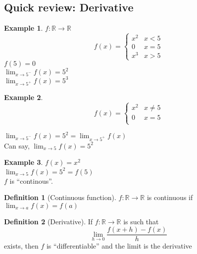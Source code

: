 \documentclass[twocolumn,20pt,fleqn]{extarticle}
\theoremstyle{plain}
\theoremstyle{definition}
\newtheorem*{definition}{Definition}
\newtheorem*{example}{Example}
\theoremstyle{remark}
\begin{document}
\subsection{Quick review: Derivative}
\begin{example}
  $f : \mathbb{R}\to \mathbb{R}$
  \[f(x) =
      \begin{cases}
        x^2 & x < 5\\
        0 & x = 5\\
        x^3 & x > 5
      \end{cases}
      \]
      $f(5)=0$\\
$\displaystyle\lim_{x \to 5^-} f(x)  = 5^2$\\
$\displaystyle\lim_{x \to 5^+} f(x)  = 5^3$
\end{example}


\begin{example}
  \[f(x) =
      \begin{cases}
        x^2 & x  \neq  5\\
        0 & x = 5\\
        
      \end{cases}
      \]
      
      


$\displaystyle\lim_{x \to 5^-} f(x) = 5^2  = \displaystyle\lim_{x \to 5^+} f(x)$\\
Can say, $\displaystyle\lim_{x \to 5} f(x) = 5^2$
\end{example}

\newpage
\begin{example}
$f(x) = x^2$\\
$\displaystyle\lim_{x \to 5} f(x) = 5^2 = f(5)$\\
$f$ is ``continous''.
\end{example}

\begin{definition}[Continuous function]
$f : \mathbb{R} \to \mathbb{R}$ is continuous if $\displaystyle\lim_{x \to a} f(x) = f(a)$
\end{definition}

\begin{definition}[Derivative]
  If $f : \mathbb{R}\to \mathbb{R}$ is such that
  \[\displaystyle\lim_{h\to 0}\frac{f(x+h) - f(x)}{h}\] exists, then $f$ is ``differentiable'' and the limit is the derivative\end{definition}


\clearpage
\end{document}
